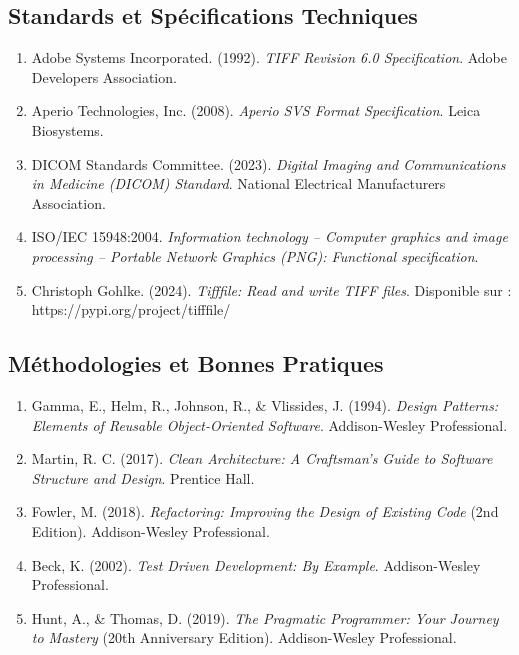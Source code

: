 \documentclass[12pt,a4paper]{article}
\begin{document}
\subsection{Standards et Spécifications Techniques}

\begin{enumerate}
\item Adobe Systems Incorporated. (1992). \textit{TIFF Revision 6.0 Specification}. Adobe Developers Association.

\item Aperio Technologies, Inc. (2008). \textit{Aperio SVS Format Specification}. Leica Biosystems.

\item DICOM Standards Committee. (2023). \textit{Digital Imaging and Communications in Medicine (DICOM) Standard}. National Electrical Manufacturers Association.

\item ISO/IEC 15948:2004. \textit{Information technology -- Computer graphics and image processing -- Portable Network Graphics (PNG): Functional specification}.

\item Christoph Gohlke. (2024). \textit{Tifffile: Read and write TIFF files}. Disponible sur : https://pypi.org/project/tifffile/
\end{enumerate}

\subsection{Méthodologies et Bonnes Pratiques}

\begin{enumerate}
\item Gamma, E., Helm, R., Johnson, R., \& Vlissides, J. (1994). \textit{Design Patterns: Elements of Reusable Object-Oriented Software}. Addison-Wesley Professional.

\item Martin, R. C. (2017). \textit{Clean Architecture: A Craftsman's Guide to Software Structure and Design}. Prentice Hall.

\item Fowler, M. (2018). \textit{Refactoring: Improving the Design of Existing Code} (2nd Edition). Addison-Wesley Professional.

\item Beck, K. (2002). \textit{Test Driven Development: By Example}. Addison-Wesley Professional.

\item Hunt, A., \& Thomas, D. (2019). \textit{The Pragmatic Programmer: Your Journey to Mastery} (20th Anniversary Edition). Addison-Wesley Professional.
\end{enumerate}
\end{document}
